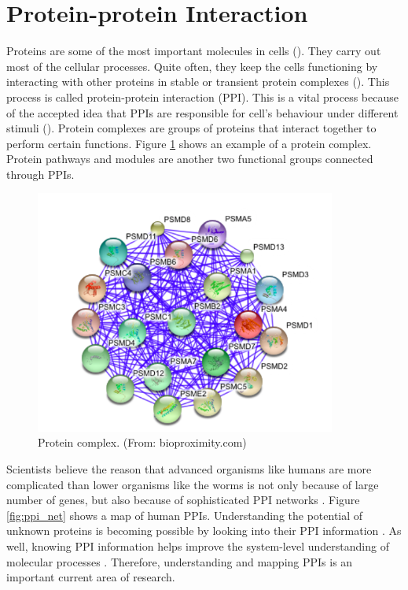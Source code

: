 \section{Protein-protein Interaction}
Proteins are some of the most important molecules in cells (\cite{schleif1993genetics}). 
They carry out most of the cellular processes. Quite often, they keep the cells functioning by interacting with other proteins in stable or transient protein complexes (\cite{eisenberg2000protein}).
This process is called protein-protein interaction (PPI). This is a vital process because of the accepted idea that PPIs are responsible for cell's behaviour under different stimuli (\cite{bader2003functional, pandey2000proteomics, schwikowski2000network}).
Protein complexes are groups of proteins that interact together to perform certain functions. Figure \ref{fig:pro_comp} shows an example of a protein complex. Protein pathways and modules are another two functional groups connected through PPIs. 
\begin{figure}[h!]
\begin{center}
\includegraphics[height = 8cm]{img/pro_comp.png}
\caption{Protein complex. (From: bioproximity.com)  \label{fig:pro_comp}}
\end{center}
\end{figure}
 Scientists believe the reason that advanced organisms like humans are more complicated than lower organisms like the worms is not only because of large number of genes, but also because of sophisticated PPI networks \cite{pitre2008computational}. Figure \ref{fig:ppi_net} shows a map of human PPIs.
Understanding the potential of unknown proteins is becoming possible by looking into their PPI information \cite{sharan2007network}. As well, knowing PPI information helps improve the system-level understanding of molecular processes \cite{levy2008evolution}.
Therefore, understanding and mapping PPIs is an important current area of research.

